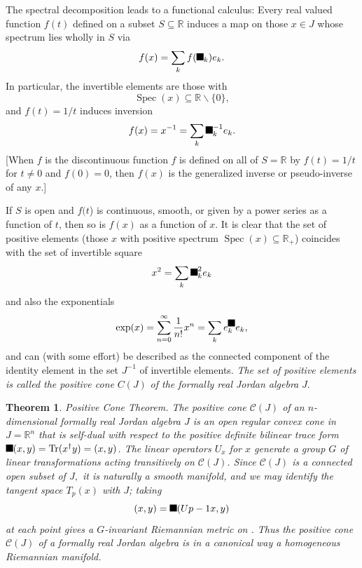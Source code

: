 \documentclass[aps,preprint]{revtex4}%
\providecommand{\U}[1]{\protect\rule{.1in}{.1in}}
\newtheorem{theorem}{Theorem}
\begin{document}
The spectral decomposition leads to a functional calculus: Every real valued
function $f\left(  t\right)  $ defined on a subset $S\subseteq\mathbb{R}$
induces a map on those $x\in J$ whose spectrum lies wholly in $S$ via
\begin{equation}
f(x)=\sum_{k}f(\U{3bb} _{k})e_{k}.
\end{equation}
In particular, the invertible elements are those with
\begin{equation}
\operatorname*{Spec}(x)\subseteq\mathbb{R}\backslash\{0\},
\end{equation}
and $f(t)=1/t$ induces inversion
\begin{equation}
f(x)=x^{-1}=\sum_{k}\U{3bb} _{k}^{-1}e_{k}.
\end{equation}
[When $f$ is the discontinuous function $f$ is defined on all of
$S=\mathbb{R}$ by $f(t)=1/t$ for $t\neq0$ and $f(0)=0$, then $f(x)$ is the
generalized inverse or pseudo-inverse of any $x$.] 

If $S$ is open and $f(t$) is continuous, smooth, or given by a power series as
a function of $t$, then so is $f(x)$ as a function of $x$. It is clear that
the set of positive elements (those $x$ with positive spectrum
$\operatorname*{Spec}(x)\subseteq\mathbb{R}_{+}$) coincides with the set of
invertible square
\begin{equation}
x^{2}=\sum_{k}\U{3bb} _{k}^{2}e_{k}%
\end{equation}
and also the exponentials
\begin{equation}
\exp(x)=\sum_{n=0}^{\infty}\frac{1}{n!}x^{n}=\sum_{k}e_{k}^{\U{3bb} }e_{k},
\end{equation}
and can (with some effort) be described as the connected component of the
identity element in the set $J^{-1}$ of invertible elements. \emph{The set of
positive elements is called the positive cone }$C(J)$\emph{ of the formally
real Jordan algebra }$J$.

\begin{theorem}
Positive Cone Theorem. The positive cone  $\mathcal{C}(J)$ of an
$n$-dimensional formally real Jordan algebra $J$ is an open regular convex
cone in $J=\mathbb{R}^{n}$ that is self-dual with respect to the positive
definite bilinear trace form $\U{3c3} (x,y)=\operatorname{Tr}(x^{\dagger
}y)=(x,y)$. The linear operators $U_{x}$ for $x$ generate a group $G$ of
linear transformations acting transitively on $\mathcal{C}(J)$. Since
$\mathcal{C}(J)$ is a connected open subset of $J,$ it is naturally a smooth
manifold, and we may identify the tangent space $T_{p}(x)$ with $J$; taking
\begin{equation}
(x,y)=\U{3c3} (Up-1x,y)
\end{equation}
at each point gives a $G$-invariant Riemannian metric on . Thus the
\emph{positive cone }$\mathcal{C}(J)$ of a formally real Jordan algebra is in
a \emph{canonical way a homogeneous Riemannian manifold}.
\end{theorem}
\end{document}
